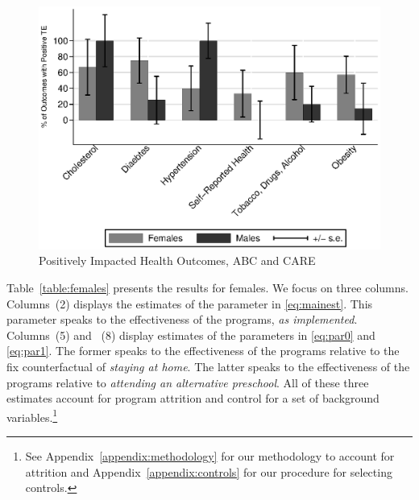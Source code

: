 \begin{figure}[H]
		\caption{Positively Impacted Health Outcomes, ABC and CARE} \label{fig:ppositivecategory2}
		\includegraphics[width=.9\columnwidth]{output/itt_noctrl_cats2.eps}
\end{figure}

\noindent Table~\ref{table:females} presents the results for females. We focus on three columns. Columns~(2) displays the estimates of the parameter in \eqref{eq:mainest}. This parameter speaks to the effectiveness of the programs, \textit{as implemented}. Columns~(5) and ~(8) display estimates of the parameters in \eqref{eq:par0} and \eqref{eq:par1}. The former speaks to the effectiveness of the programs relative to the fix counterfactual of \textit{staying at home}. The latter speaks to the effectiveness of the programs relative to \textit{attending an alternative preschool}. All of these three estimates account for program attrition and control for a set of background variables.\footnote{See Appendix~\ref{appendix:methodology} for our methodology to account for attrition and Appendix~\ref{appendix:controls} for our procedure for selecting controls.}\\ 

